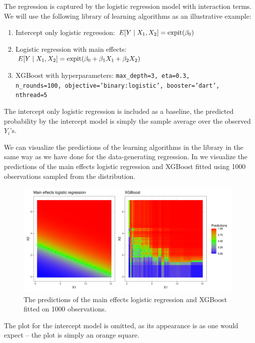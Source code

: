 \documentclass[./main.tex]{subfiles}
\begin{document}
The regression is captured by the logistic regression model with interaction terms. We will use the following library of learning algorithms as an illustrative example:
\begin{enumerate}
    \item Intercept only logistic regression: $E[Y \mid X_1, X_2] = \operatorname{expit}(\beta_0)$
    \item Logistic regression with main effects: $E[Y \mid X_1, X_2] = \operatorname{expit}(\beta_0 + \beta_1 X_1 + \beta_2 X_2)$
    \item XGBoost with hyperparameters: \texttt{max\_depth=3, eta=0.3,\\ n\_rounds=100, objective='binary:logistic', booster='dart', nthread=5}
\end{enumerate}
The intercept only logistic regression is included as a baseline, the predicted probability by the intercept model is simply the sample average over the observed $ Y_i$'s. 

We can visualize the predictions of the learning algorithms in the library in the same way as we have done for the data-generating regression. In  we visualize the predictions of the main effects logistic regression and XGBoost fitted using 1000 observations sampled from the distribution. 
\begin{figure}
    \centering
    \includegraphics[width=\textwidth]{figures/predictpar.png}
    \caption{The predictions of the main effects logistic regression and XGBoost fitted on 1000 observations.}
    \label{fig:predictpar}
\end{figure}
The plot for the intercept model is omitted, as its appearance is as one would expect -- the plot is simply an orange square. 
\end{document}

